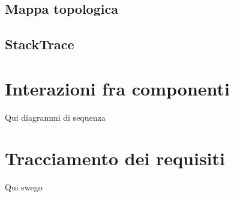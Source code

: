 \subsection{Mappa topologica}

\subsection{StackTrace}


\section{Interazioni fra componenti}
\label{sec:Interazioni}
Qui diagrammi di sequenza

\section{Tracciamento dei requisiti}
\label{sec:Tracciamento}
Qui swego 
